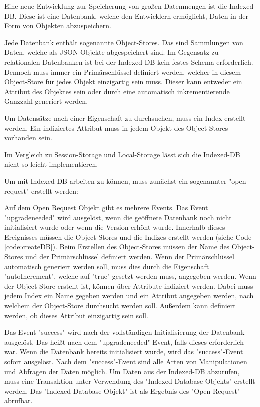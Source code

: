 
Eine neue Entwicklung zur Speicherung von großen Datenmengen ist die Indexed-DB. 
Diese ist eine Datenbank, welche den Entwicklern ermöglicht, Daten in der Form von Objekten abzuspeichern.

Jede Datenbank enthält sogenannte Object-Stores. Das sind Sammlungen von Daten, welche als JSON Objekte abgespeichert sind. 
Im Gegensatz zu relationalen Datenbanken ist bei der Indexed-DB kein festes Schema erforderlich. 
Dennoch muss immer ein Primärschlüssel definiert werden, welcher in diesem Object-Store für jedes Objekt einzigartig sein muss.
Dieser kann entweder ein Attribut des Objektes sein oder durch eine automatisch inkrementierende Ganzzahl generiert werden. 

Um Datensätze nach einer Eigenschaft zu durchsuchen, muss ein Index erstellt werden. Ein indiziertes Attribut muss in jedem Objekt des Object-Stores vorhanden sein.

Im Vergleich zu Session-Storage und Local-Storage lässt sich die Indexed-DB nicht so leicht implementieren.

Um mit Indexed-DB arbeiten zu können, muss zunächst ein sogenannter "open request" erstellt werden:


Auf dem Open Request Objekt gibt es mehrere Events. 
Das Event "upgradeneeded" wird ausgelöst, wenn die geöffnete Datenbank noch nicht initialisiert wurde oder wenn die Version erhöht wurde. 
Innerhalb dieses Ereignisses müssen die Object Stores und die Indizes erstellt werden (siehe Code \ref{code:createDB}). 
Beim Erstellen des Object-Stores müssen der Name des Object-Stores und der Primärschlüssel definiert werden. Wenn der Primärschlüssel automatisch generiert werden soll, muss dies durch die Eigenschaft "autoIncrement", welche auf "true" gesetzt werden muss, angegeben werden.
Wenn der Object-Store erstellt ist, können über Attribute indiziert werden. Dabei muss jedem Index ein Name gegeben werden und ein Attribut angegeben werden, nach welchem der Object-Store durchsucht werden soll. Außerdem kann definiert werden, ob dieses Attribut einzigartig sein soll.


Das Event "success" wird nach der vollständigen Initialisierung der Datenbank ausgelöst. 
Das heißt nach dem "upgradeneeded"-Event, falls dieses erforderlich war. 
Wenn die Datenbank bereits initialisiert wurde, wird das "success"-Event sofort ausgelöst. 
Nach dem "success"-Event sind alle Arten von Manipulationen und Abfragen der Daten möglich. 
Um Daten aus der Indexed-DB abzurufen, muss eine Transaktion unter Verwendung des "Indexed Database Objekts" erstellt werden. 
Das "Indexed Database Objekt" ist als Ergebnis des "Open Request" abrufbar.

